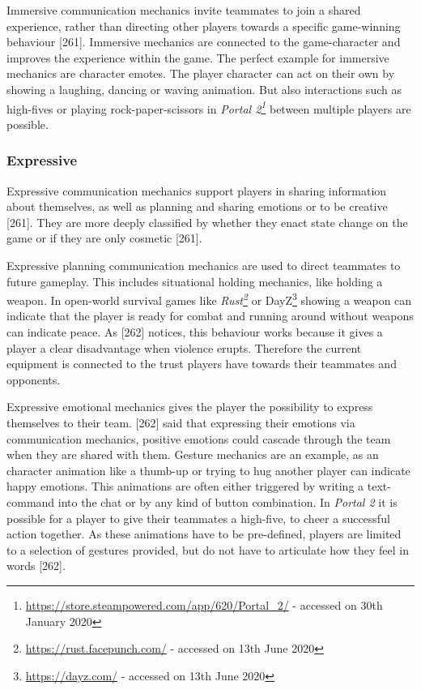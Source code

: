 Immersive communication mechanics invite teammates to join a shared experience, rather than directing other players towards a specific game-winning behaviour \autocite{Toups2014ATheory}[261].
Immersive mechanics are connected to the game-character and improves the experience within the game. The perfect example for immersive mechanics are character emotes. The player character can act on their own by showing a laughing, dancing or waving animation. But also interactions such as high-fives or playing rock-paper-scissors in \textit{Portal 2\footnote{\url{https://store.steampowered.com/app/620/Portal_2/} - accessed on 30th January 2020}} between multiple players are possible.

\subsubsection{Expressive}
\label{section:Expressive}
 Expressive communication mechanics support players in sharing information about themselves, as well as planning and sharing emotions or to be creative \autocite{Toups2014ATheory}[261]. They are more deeply classified by whether they enact state change on the game or if they are only cosmetic \autocite{Toups2014ATheory}[261].


Expressive planning communication mechanics are used to direct teammates to future gameplay. This includes situational holding mechanics, like holding a weapon. In open-world survival games like \textit{Rust\footnote{\url{https://rust.facepunch.com/} - accessed on 13th June 2020}} or DayZ\footnote{\url{https://dayz.com/} - accessed on 13th June 2020} showing a weapon can indicate that the player is ready for combat and running around without weapons can indicate peace. As \textcite{Toups2014ATheory}[262] notices, this behaviour works because it gives a player a clear disadvantage when violence erupts. Therefore the current equipment is connected to the trust players have towards their teammates and opponents.


Expressive emotional mechanics gives the player the possibility to express themselves to their team. \textcite{Toups2014ATheory}[262] said that expressing their emotions via communication mechanics, positive emotions could cascade through the team when they are shared with them. Gesture mechanics are an example, as an character animation like a thumb-up or trying to hug another player can indicate happy emotions. This animations are often either triggered by writing a text-command into the chat or by any kind of button combination. In \textit{Portal 2} it is possible for a player to give their teammates a high-five, to cheer a successful action together. As these animations have to be pre-defined, players are limited to a selection of gestures provided, but do not have to articulate how they feel in words \autocite{Toups2014ATheory}[262].

